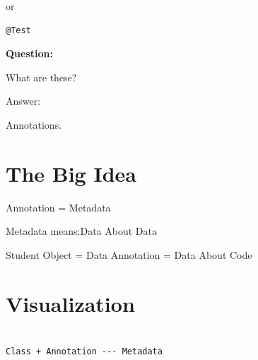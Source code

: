 \documentclass[11pt,a4paper]{book}
\begin{document}
or

\begin{verbatim} 
@Test
\end{verbatim}


\textbf{Question:}


What are these?


Answer:


Annotations.



\section{The Big Idea}

Annotation = Metadata


Metadata means:Data About Data

\begin{mentalmodel}

Student Object = Data
Annotation = Data About Code

\end{mentalmodel}


\section{Visualization}

\begin{verbatim}

Class + Annotation --- Metadata

\end{verbatim}
\end{document}
